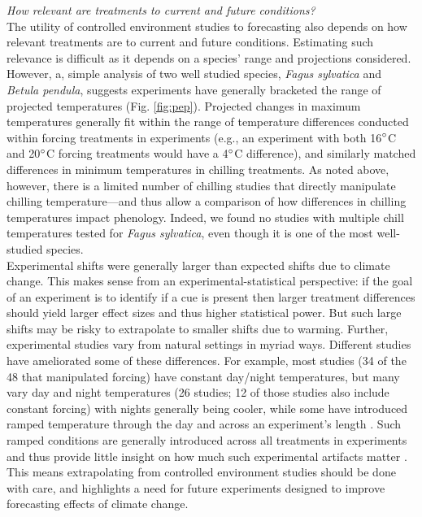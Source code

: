 \documentclass[11pt,letter]{article}
\begin{document}
\emph{How relevant are treatments to current and future conditions?}\\
The utility of controlled environment studies to forecasting also depends on how relevant treatments are to current and future conditions. Estimating such relevance is difficult as it depends on a species' range and projections considered. However, a, simple analysis of two well studied species, \emph{Fagus sylvatica} and \emph{Betula pendula}, suggests experiments have generally bracketed the range of projected temperatures (Fig. \ref{fig:pep}). Projected changes in maximum temperatures generally fit within the range of temperature differences conducted within forcing treatments in experiments (e.g., an experiment with both 16$\degree$C  and 20$\degree$C forcing treatments would have a 4$\degree$C difference), and similarly matched differences in minimum temperatures in chilling treatments. As noted above, however, there is a limited number of chilling studies that directly manipulate chilling temperature---and thus allow a comparison of how differences in chilling temperatures impact phenology. Indeed, we found no studies with multiple chill temperatures tested for \emph{Fagus sylvatica}, even though it is one of the most well-studied species. \\

Experimental shifts were generally larger than expected shifts due to climate change. This makes sense from an experimental-statistical perspective: if the goal of an experiment is to identify if a cue is present then larger treatment differences should yield larger effect sizes and thus higher statistical power. But such large shifts may be risky to extrapolate to smaller shifts due to warming. Further, experimental studies vary from natural settings in myriad ways. Different studies have ameliorated some of these differences. For example, most studies (34 of the 48 that manipulated forcing) have constant day/night temperatures, but many vary day and night temperatures (26 studies; 12 of those studies also include constant forcing) with nights generally being cooler, while some have introduced ramped temperature through the day and across an experiment's length \citep[e.g.,][]{Basler:2012,Laube:2014a}. Such ramped conditions are generally introduced across all treatments in experiments and thus provide little insight on how much such experimental artifacts matter \citep[but see][]{erwin1995}. This means extrapolating from controlled environment studies should be done with care, and highlights a need for future experiments designed to improve forecasting effects of climate change. 
\end{document}
